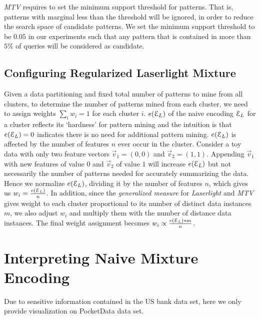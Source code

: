 \begin{appendices}
\textit{MTV} requires to set the minimum support threshold for patterns. That is, patterns with marginal less than the threshold will be ignored, in order to reduce the search space of candidate patterns.
We set the minimum support threshold to be $0.05$ in our experiments such that any pattern that is contained in more than $5\%$ of queries will be considered as candidate.

\subsection{Configuring Regularized Laserlight Mixture}
\label{appendix:Configuring_Regularized Laserlight_Mixture}
Given a data partitioning and fixed total number of patterns to mine from all clusters, to determine the number of patterns mined from each cluster, we need to assign weights $\sum_i w_i=1$ for each cluster $i$. 
\errorname $e(\mathcal E_L)$ of the naive encoding $\mathcal E_L$ for a cluster reflects its `hardness' for pattern mining and the intuition is that $e(\mathcal E_L)=0$ indicates there is no need for additional pattern mining.
\errorname $e(\mathcal E_L)$ is affected by the number of features $n$ ever occur in the cluster.
Consider a toy data with only two feature vectors $\vec v_1=(0,0)$ and $\vec v_2=(1,1)$. Appending $\vec v_1$ with new features of value $0$ and $\vec v_2$ of value $1$ will increase $e(\mathcal E_L)$ but not necessarily the number of patterns needed for accurately summarizing the data.
Hence we normalize $e(\mathcal E_L)$, dividing it by the number of features $n$, which gives us $w_i=\frac{e(\mathcal E_L)}{n}$.
In addition, since the \textit{generalized measure} for \textit{Laserlight} and \textit{MTV} gives weight to each cluster proportional to its number of distinct data instances $m$, we also adjust $w_i$ and multiply them with the number of distance data instances.
The final weight assignment becomes $w_i \propto \frac{e(\mathcal E_L)*m}{n}$.

\section{Interpreting Naive Mixture Encoding}
\label{appendix:naivemixturesummaryvisualization}
Due to sensitive information contained in the US bank data set, here we only provide visualization on PocketData data set.


\end{appendices}

